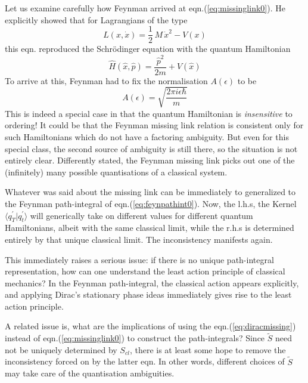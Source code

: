\documentclass[12pt]{article}
\newcommand{\be}{\begin{equation}}
\newcommand{\ee}{\end{equation}}
\begin{document}
Let us
examine carefully how Feynman arrived at eqn.(\ref{eq:missinglink0}).
He explicitly showed that for Lagrangians of the type
\be
\label{eq:quadL}
L(x,{\dot x}) = \frac{1}{2}\,M\,{\dot x}^2 - V(x)
\ee
this eqn. reproduced the Schr\"odinger equation with the quantum Hamiltonian 
\be
\label{eq:quadH}
{\hat H({\hat x},{\hat p})} = \frac{{\hat p}^2}{2m} + V({\hat x})
\ee
To arrive at this, Feynman had to fix the normalisation $A(\epsilon)$ to be
\be
\label{eq:normfeyn}
A(\epsilon) = \sqrt{\frac{2\pi i \epsilon \hbar}{m}}
\ee
This is indeed a special case in that the quantum Hamiltonian is {\it insensitive} to ordering! It could be that the Feynman missing link
relation is consistent
only for such Hamiltonians which do not have a factoring ambiguity. But even for this special class, the second source of ambiguity is
still there, so the situation is not entirely clear. Differently stated, the Feynman missing link picks out one of the
(infinitely) many possible quantisations of a classical system. 

Whatever was said about the missing link can be immediately to generalized to the Feynman path-integral of eqn.(\ref{eq:feynpathint0}).
Now, the l.h.s, the Kernel $\langle q_T^\prime|q_t^\prime\rangle$ will generically take on different values for different quantum Hamiltonians,
albeit with the same classical limit, while the r.h.s is determined entirely by that unique classical limit. The inconsistency manifests
again.

This immediately raises a serious issue: if there is no unique path-integral representation, how can one understand the least action principle
of classical mechanics? In the Feynman path-integral, the classical action appears explicitly, and applying Dirac's stationary phase ideas
immediately gives rise to the least action principle.

A related issue is, what are the implications of using the eqn.(\ref{eq:diracmissing}) instead of eqn.(\ref{eq:missinglink0}) to
construct the path-integrals? Since ${\tilde S}$ need not be uniquely determined by $S_{cl}$, there is at least some hope to remove
the inconsistency forced on by the latter eqn. In other words, different choices of ${\tilde S}$ may take care of the quantisation ambiguities.
\end{document}
